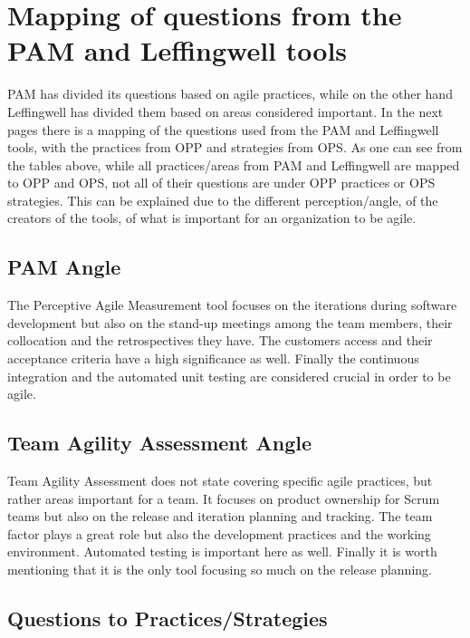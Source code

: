 \section{Mapping of questions from the PAM and Leffingwell tools}
\label{mapping}

PAM has divided its questions based on agile practices, while on the other hand Leffingwell has divided them based on areas considered important. In the next pages there is a mapping of the questions used from the PAM and Leffingwell tools, with the practices from OPP and strategies from OPS. As one can see from the tables above, while all practices/areas from PAM and Leffingwell are mapped to OPP and OPS, not all of their questions are under OPP practices or OPS strategies. This can be explained due to the different perception/angle, of the creators of the tools, of what is important for an organization to be agile.

\subsection{PAM Angle}
The Perceptive Agile Measurement tool focuses on the iterations during software development but also on the stand-up meetings among the team members, their collocation and the retrospectives they have. The customers access and their acceptance criteria have a high significance as well. Finally the continuous integration and the automated unit testing are considered crucial in order to be agile.

\subsection{Team Agility Assessment Angle}
Team Agility Assessment does not state covering specific agile practices, but rather areas important for a team. It focuses on product ownership for Scrum teams but also on the release and iteration planning and tracking. The team factor plays a great role but also the development practices and the working environment. Automated testing is important here as well. Finally it is worth mentioning that it is the only tool focusing so much on the release planning.




\subsection{Questions to Practices/Strategies}

